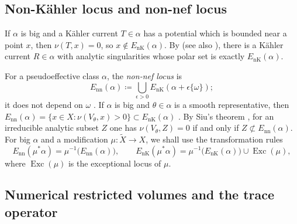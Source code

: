 \documentclass[11pt,a4paper]{amsart}
\newcommand{\EnK}{E_{\mathrm{nK}}}
\newcommand{\Enn}{E_{\mathrm{nn}}}
\DeclareMathOperator{\Exc}{Exc}
\theoremstyle{definition}
\begin{document}
\subsection{Non-K\"ahler locus and non-nef locus}\label{sec:nK}

If $\alpha$ is big and a K\"ahler current $T\in\alpha$ has a potential
which is bounded near a point $x$, then $\nu(T,x)=0$, so
$x\notin\EnK(\alpha)$. By \cite[Theorem~3.17]{Bou04} (see also
\cite[Theorem~1.7.1]{XiaSGPT}), there is a K\"ahler current $R\in\alpha$
with analytic singularities whose polar set is exactly $\EnK(\alpha)$.

For a pseudoeffective class $\alpha$, the \emph{non-nef locus} is
\[
  \Enn(\alpha)\coloneqq \bigcup_{\epsilon>0}\EnK(\alpha+\epsilon\{\omega\});
\]
it does not depend on $\omega$ \cite[Section~2]{CT22}. If $\alpha$ is big
and $\theta\in\alpha$ is a smooth representative, then
$\Enn(\alpha)=\{x\in X:\nu(V_\theta,x)>0\}\subset\EnK(\alpha)$
\cite[Definitions~1.7.6 and~1.7.7]{XiaSGPT}. By Siu's theorem
\cite{Siu74}, for an irreducible analytic subset $Z$ one has
$\nu(V_\theta,Z)=0$ if and only if $Z\not\subset\Enn(\alpha)$. For big
$\alpha$ and a modification $\mu\colon\widetilde X\to X$, we shall use
the transformation rules \cite[Lemmas~4.1 and~4.3]{CT22}
\begin{equation}\label{eq:transformation-rules}
  \Enn(\mu^*\alpha)=\mu^{-1}\bigl(\Enn(\alpha)\bigr),\qquad
  \EnK(\mu^*\alpha)=\mu^{-1}\bigl(\EnK(\alpha)\bigr)\cup\Exc(\mu),
\end{equation}
where $\Exc(\mu)$ is the exceptional locus of $\mu$.

\subsection{Numerical restricted volumes and the trace
operator}\label{sec:restricted-volumes}
\end{document}
